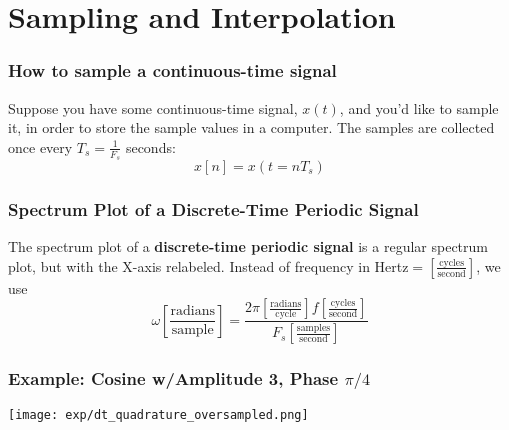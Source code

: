 \documentclass{beamer}
\begin{document}
\section[Sampling]{Sampling and Interpolation}
\setcounter{subsection}{1}

\begin{frame}
  \frametitle{How to sample a continuous-time signal}

  Suppose you have some continuous-time signal, $x(t)$, and you'd like
  to sample it, in order to store the sample values in a computer.
  The samples are collected once every $T_s=\frac{1}{F_s}$ seconds:
  \begin{displaymath}
    x[n] = x(t=nT_s)
  \end{displaymath}
\end{frame}

\begin{frame}
  \frametitle{Spectrum Plot of a Discrete-Time Periodic Signal}

  The spectrum plot of a {\bf discrete-time periodic signal} is a
  regular spectrum plot, but with the X-axis relabeled.  Instead of
  frequency in Hertz$=\left[\frac{\mbox{cycles}}{\mbox{second}}\right]$, we use
    \begin{displaymath}
      \omega \left[\frac{\mbox{radians}}{\mbox{sample}}\right] =
      \frac{2\pi \left[\frac{\mbox{radians}}{\mbox{cycle}}\right]f\left[\frac{\mbox{cycles}}{\mbox{second}}\right]}{F_s\left[\frac{\mbox{samples}}{\mbox{second}}\right]}
    \end{displaymath}
\end{frame}

\begin{frame}
  \frametitle{Example: Cosine w/Amplitude 3, Phase $\pi/4$}

  \centerline{\texttt{[image: exp/dt\_quadrature\_oversampled.png]}}
\end{frame}
\end{document}
